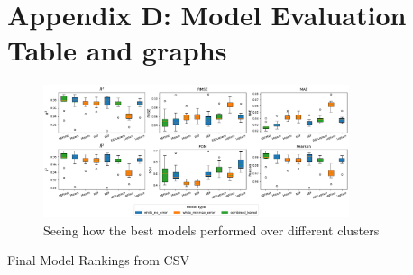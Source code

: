 \documentclass{article}
\begin{document}
\section{Appendix D: Model Evaluation Table and graphs}
\label{appendix:D}

\begin{figure}[H]
    \centering
    \includegraphics[width=0.8\textwidth]{LatexPlots/CV_plots/boxplots.png}
    \caption{Seeing how the best models performed over different clusters}
    \label{fig:boxplots}
\end{figure}

\begin{table}[H]
    \centering
    \scriptsize
    \caption{Final Model Rankings from CSV}
    \label{tab:rankingtable}
\end{table}
    



% 
% 
 
\end{document}
